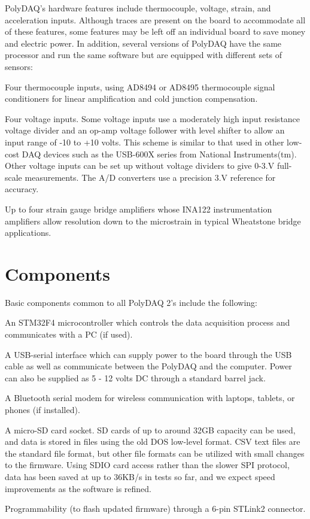 Poly\-D\-A\-Q's hardware features include thermocouple, voltage, strain, and acceleration inputs. Although traces are present on the board to accommodate all of these features, some features may be left off an individual board to save money and electric power. In addition, several versions of Poly\-D\-A\-Q have the same processor and run the same software but are equipped with different sets of sensors\-: \begin{DoxyItemize}
\item Four thermocouple inputs, using A\-D8494 or A\-D8495 thermocouple signal conditioners for linear amplification and cold junction compensation. \item Four voltage inputs. Some voltage inputs use a moderately high input resistance voltage divider and an op-\/amp voltage follower with level shifter to allow an input range of -\/10 to +10 volts. This scheme is similar to that used in other low-\/cost D\-A\-Q devices such as the U\-S\-B-\/600\-X series from National Instruments(tm). Other voltage inputs can be set up without voltage dividers to give 0-\/3.\-V full-\/scale measurements. The A/\-D converters use a precision 3.\-V reference for accuracy. \item Up to four strain gauge bridge amplifiers whose I\-N\-A122 instrumentation amplifiers allow resolution down to the microstrain in typical Wheatstone bridge applications.\end{DoxyItemize}
\hypertarget{index_Components}{}\section{Components}\label{index_Components}
Basic components common to all Poly\-D\-A\-Q 2's include the following\-: \begin{DoxyItemize}
\item An S\-T\-M32\-F4 microcontroller which controls the data acquisition process and communicates with a P\-C (if used). \item A U\-S\-B-\/serial interface which can supply power to the board through the U\-S\-B cable as well as communicate between the Poly\-D\-A\-Q and the computer. Power can also be supplied as 5 -\/ 12 volts D\-C through a standard barrel jack. \item A Bluetooth serial modem for wireless communication with laptops, tablets, or phones (if installed). \item A micro-\/\-S\-D card socket. S\-D cards of up to around 32\-G\-B capacity can be used, and data is stored in files using the old D\-O\-S low-\/level format. C\-S\-V text files are the standard file format, but other file formats can be utilized with small changes to the firmware. Using S\-D\-I\-O card access rather than the slower S\-P\-I protocol, data has been saved at up to 36\-K\-B/s in tests so far, and we expect speed improvements as the software is refined. \item Programmability (to flash updated firmware) through a 6-\/pin S\-T\-Link2 connector.\end{DoxyItemize}
